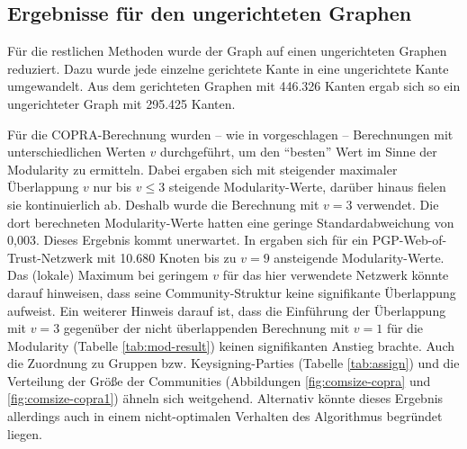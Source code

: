 \subsection{Ergebnisse für den ungerichteten Graphen}
\label{sec:ergebnisse-fur-den-1}

Für die restlichen Methoden wurde der Graph auf einen ungerichteten
Graphen reduziert. Dazu wurde jede einzelne gerichtete Kante in eine
ungerichtete Kante umgewandelt. Aus dem gerichteten Graphen mit 446.326
Kanten ergab sich so ein ungerichteter Graph mit 295.425 Kanten.

Für die COPRA-Berechnung wurden -- wie in \cite{Gregory2010}
vorgeschlagen -- Berechnungen mit unterschiedlichen Werten $v$
durchgeführt, um den ``besten'' Wert im Sinne der Modularity zu
ermitteln. Dabei ergaben sich mit steigender maximaler Überlappung
$v$ nur bis $v\le 3$ steigende Modularity-Werte, darüber hinaus
fielen sie kontinuierlich ab. Deshalb wurde die Berechnung mit $v=3$
verwendet. Die dort berechneten Modularity-Werte hatten eine geringe
Standardabweichung von 0,003. Dieses Ergebnis kommt unerwartet. In
\cite{Gregory2010} ergaben sich für ein PGP-Web-of-Trust-Netzwerk
mit 10.680 Knoten bis zu $v=9$ ansteigende Modularity-Werte. Das
(lokale) Maximum bei geringem $v$ für das hier verwendete Netzwerk
könnte darauf hinweisen, dass seine Community-Struktur keine
signifikante Überlappung aufweist. Ein weiterer Hinweis darauf ist,
dass die Einführung der Überlappung mit $v=3$ gegenüber der
nicht überlappenden Berechnung mit $v=1$ für die Modularity
(Tabelle \ref{tab:mod-result}) keinen signifikanten Anstieg
brachte. Auch die Zuordnung zu Gruppen bzw. Keysigning-Parties
(Tabelle \ref{tab:assign}) und die Verteilung der Größe der
Communities (Abbildungen \ref{fig:comsize-copra} und
\ref{fig:comsize-copra1}) ähneln sich weitgehend. Alternativ
könnte dieses Ergebnis allerdings auch in einem nicht-optimalen
Verhalten des Algorithmus begründet liegen.

